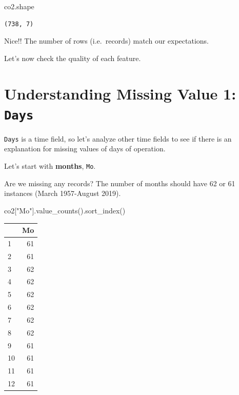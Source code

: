 \documentclass[
  letterpaper,
  DIV=11,
  numbers=noendperiod]{scrreprt}
\newenvironment{Shaded}{\begin{snugshade}}{\end{snugshade}}
\newcommand{\NormalTok}[1]{\textcolor[rgb]{0.00,0.23,0.31}{#1}}
\newcommand{\StringTok}[1]{\textcolor[rgb]{0.13,0.47,0.30}{#1}}
\begin{document}
\begin{Shaded}
\begin{Highlighting}[]
\NormalTok{co2.shape}
\end{Highlighting}
\end{Shaded}

\begin{verbatim}
(738, 7)
\end{verbatim}

Nice!! The number of rows (i.e.~records) match our expectations.

Let's now check the quality of each feature.

\hypertarget{understanding-missing-value-1-days}{%
\section{\texorpdfstring{Understanding Missing Value 1:
\texttt{Days}}{Understanding Missing Value 1: Days}}\label{understanding-missing-value-1-days}}

\texttt{Days} is a time field, so let's analyze other time fields to see
if there is an explanation for missing values of days of operation.

Let's start with \textbf{months}, \texttt{Mo}.

Are we missing any records? The number of months should have 62 or 61
instances (March 1957-August 2019).

\begin{Shaded}
\begin{Highlighting}[]
\NormalTok{co2[}\StringTok{"Mo"}\NormalTok{].value\_counts().sort\_index()}
\end{Highlighting}
\end{Shaded}

\begin{tabular}{lr}
\toprule
{} &  Mo \\
\midrule
1  &  61 \\
2  &  61 \\
3  &  62 \\
4  &  62 \\
5  &  62 \\
6  &  62 \\
7  &  62 \\
8  &  62 \\
9  &  61 \\
10 &  61 \\
11 &  61 \\
12 &  61 \\
\bottomrule
\end{tabular}
\end{document}
